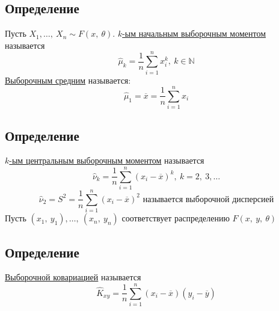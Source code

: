 \documentclass[12pt, a4paper]{article}
\begin{document}
\subsection*{Определение}
Пусть $X_1,\dots,\ X_n \sim F(x,\ \theta)$. \underline{$k$-ым начальным выборочным моментом} называется \[\hat{\mu}_k = \frac{1}{n} \sum_{i = 1}^{n} x_i^k,\ k \in \mathbb{N}\]
\underline{Выборочным средним} называется:
\[\hat{\mu}_1 = \overline{x} = \frac{1}{n} \sum_{i = 1}^{n} x_i\]
\subsection*{Определение}
\underline{$k$-ым центральным выборочным моментом} называется 
\[\hat{\nu}_k = \frac{1}{n} \sum_{i = 1}^{n} (x_i - \overline{x})^k,\ k = 2,\ 3,\dots\]
\[\hat{\nu}_2 = S^2 = \frac{1}{n} \sum_{i = 1}^{n} (x_i - \overline{x})^2 \text{ называется выборочной дисперсией}\]
Пусть $(x_1,\ y_1),\dots,\ (x_n,\ y_n)$ соответствует распределению $F(x,\ y,\ \theta)$
\subsection*{Определение}
\underline{Выборочной ковариацией} называется
\[\hat{K}_{xy} = \frac{1}{n}\sum_{i = 1}^{n} (x_i - \overline{x}) (y_i - \overline{y})\]
\end{document}
